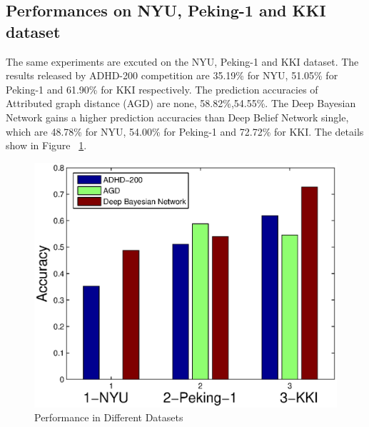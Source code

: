 \documentclass[10pt,twocolumn,letterpaper]{article}
\begin{document}
\subsection{Performances on NYU, Peking-1 and KKI dataset}
The same experiments are excuted on the NYU, Peking-1 and KKI dataset. The results released by ADHD-200 competition are 35.19\% for NYU, 51.05\% for Peking-1 and 61.90\% for KKI respectively. The prediction accuracies of Attributed graph distance\cite{19} (AGD) are none, 58.82\%,54.55\%. The Deep Bayesian Network  gains a higher prediction accuracies than Deep Belief Network single, which are 48.78\% for NYU, 54.00\% for Peking-1 and 72.72\% for KKI. The details show in Figure ~\ref{fig:dataset}.
\begin{figure}[ht]
\begin{center}
   \includegraphics[width=0.8\linewidth]{Figures/Datasets.eps}
\end{center}
   \caption{Performance in Different Datasets}
\label{fig:dataset}
\end{figure}
\end{document}
